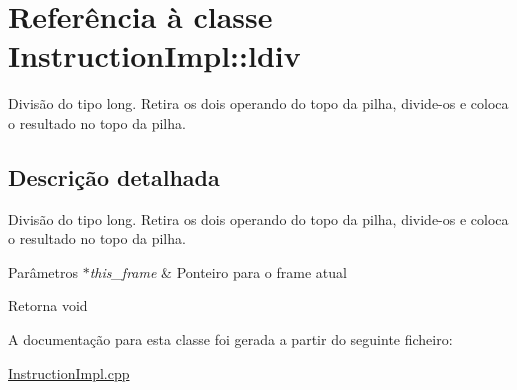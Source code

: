 \hypertarget{class_instruction_impl_1_1ldiv}{}\section{Referência à classe Instruction\+Impl\+:\+:ldiv}
\label{class_instruction_impl_1_1ldiv}


Divisão do tipo long. Retira os dois operando do topo da pilha, divide-\/os e coloca o resultado no topo da pilha.  




\subsection{Descrição detalhada}
Divisão do tipo long. Retira os dois operando do topo da pilha, divide-\/os e coloca o resultado no topo da pilha. 


\begin{DoxyParams}{Parâmetros}
{\em $\ast$this\+\_\+frame} & Ponteiro para o frame atual \\
\hline
\end{DoxyParams}
\begin{DoxyReturn}{Retorna}
void 
\end{DoxyReturn}


A documentação para esta classe foi gerada a partir do seguinte ficheiro\+:\begin{DoxyCompactItemize}
\item 
\hyperlink{_instruction_impl_8cpp}{Instruction\+Impl.\+cpp}\end{DoxyCompactItemize}
